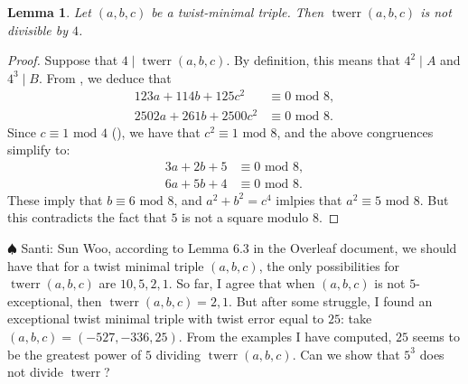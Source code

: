 \documentclass[12pt]{amsart}
\newcounter{counter}[section] %
\numberwithin{equation}{section} %
\newtheorem{lemma}[counter]{Lemma}
\theoremstyle{definition} \newtheorem{definition}[counter]{Definition}
\theoremstyle{remark} \newtheorem{nonexam}[counter]{Non-example}
\newcommand{\md}{\text{ mod }} %
\newcommand{\santi}[1]{{\color{cyan} \sf
    $\spadesuit$ Santi: #1}}
\DeclareMathOperator{\twerr}{twerr} %
\begin{document}
\begin{lemma}
  \label{lemma:4-nmid-twerr}
  Let $(a,b,c)$ be a twist-minimal triple. Then
  $\twerr(a,b,c)$ is not divisible by $4$.
\end{lemma}
\begin{proof}
  Suppose that $4 \mid \twerr(a,b,c)$. By definition, this means that $4^2 \mid
  A$ and $4^3 \mid B$. From , we deduce that
  \begin{align*}
    123a + 114b + 125c^2 &\equiv 0 \md 8, \\
    2502a + 261b + 2500c^2 &\equiv 0 \md 8.
  \end{align*}
  Since $c \equiv 1 \md 4$ (), we have that
  $c^2 \equiv 1 \md 8$, and the above congruences simplify to:
    \begin{align*}
    3a + 2b + 5 &\equiv 0 \md 8, \\
    6a + 5b + 4 &\equiv 0 \md 8.
    \end{align*}
    These imply that $b \equiv 6 \md 8$, and $a^2 + b^2 = c^4$ imlpies that
    $a^2 \equiv 5 \md 8$. But this contradicts the fact that $5$ is not a
    square modulo $8$.
  \end{proof}

  \santi{Sun Woo, according to Lemma 6.3 in the Overleaf document, we should
    have that for a twist minimal triple $(a,b,c)$, the only possibilities for
    $\twerr(a,b,c)$ are $10, 5, 2, 1$. So far, I agree that when $(a,b,c)$ is
    not $5$-exceptional, then $\twerr(a,b,c) = 2, 1$. But after some struggle,
    I found an exceptional twist minimal triple with twist error equal to $25$:
    take $(a,b,c) = (-527, -336, 25)$. From the examples I have computed, $25$
    seems to be the greatest power of $5$ dividing $\twerr(a,b,c)$. Can we show
    that $5^3$ does not divide $\twerr$?}

\clearpage
{} 
\end{document}
